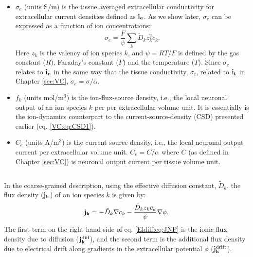 \begin{itemize}
\item $\sigma_e$ (units S/m) is the tissue averaged extracellular conductivity for extracellular current densities defined as ${\bf i_e}$. As we show later, $\sigma_e$ can be expressed as a function of ion concentrations:
\begin{equation}
\sigma_e = \frac{F}{\psi}\sum_{k} \tilde{D}_k z_{k}^2 c_{k}.
\label{Eldiff:eq:sigma1}
\end{equation}
Here $z_{k}$ is the valency of ion species $k$, and $\psi=RT/F$ is defined by the gas constant ($R$), Faraday's constant ($F$) and the temperature ($T$). Since $\sigma_e$ relates to ${\bf i_e}$ in the same way that the tissue conductivity, $\sigma_t$, related to ${\bf i_t}$ in Chapter \ref{sec:VC}, $\sigma_e = \sigma /\alpha$.

\item $f_k$ (units mol/m$^3$) is the ion-flux-source density, i.e., the local neuronal output of an ion species $k$ per per extracellular volume unit. It is essentially is the ion-dynamics counterpart to the current-source-density (CSD) presented earlier (eq. \ref{VC:eq:CSD1}).

\item $C_e$ (units A/m$^3$) is the current source density, i.e., the local neuronal output current per extracellular volume unit. $C_e = C/\alpha$ where $C$ (as defined in Chapter \ref{sec:VC}) is neuronal output current per tissue volume unit.
\end{itemize}


\subsection{}
\label{sec:Eldiff:ionconcentrationdynamics}
In the coarse-grained description, using the effective diffusion constant, $\tilde{D}_k$, the flux density (${\bf j_k}$) of an ion species $k$ is given by:
\begin{equation}
{\bf j_k} = - \tilde{D}_k {\bf \nabla} c_{k} - \frac{\tilde{D}_k z_k c_k}{\psi} {\bf \nabla} \phi.
\label{Eldiff:eq:JNP}
\end{equation}
The first term on the right hand side of eq. \ref{Eldiff:eq:JNP} is the ionic flux density due to diffusion (${\bf j_{k}^\text{diff}}$), and the second term is the additional flux density due to electrical drift along gradients in the extracellular potential $\phi$ (${\bf j_{k}^\text{drift}}$). 

